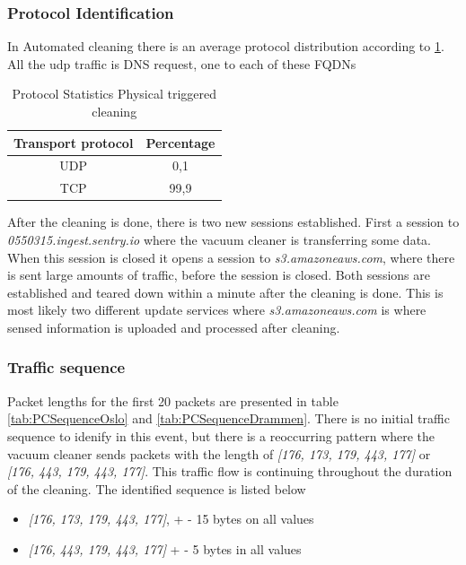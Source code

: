 \subsubsection{Protocol Identification}
In Automated cleaning there is an average protocol distribution according to \ref{tab:pcanalysisdist}. All the udp traffic is DNS request, one to each of these FQDNs

\begin{table}[H]
\centering
\caption{Protocol Statistics Physical triggered cleaning}
\label{tab:pcanalysisdist}
\begin{tabular}{|c|c|}
\hline
\textbf{Transport protocol} & \textbf{Percentage} \\ \hline
UDP                         & 0,1                 \\ \hline
TCP                         & 99,9                \\ \hline
\end{tabular}
\end{table}

After the cleaning is done, there is two new sessions established. First a session to \textit{0550315.ingest.sentry.io} where the vacuum cleaner is transferring some data. When this session is closed it opens a session to \textit{s3.amazoneaws.com}, where there is sent large amounts of traffic, before the session is closed. Both sessions are established and teared down within a minute after the cleaning is done. This is most likely two different update services where \textit{s3.amazoneaws.com} is where sensed information is uploaded and processed after cleaning.

\subsubsection{Traffic sequence}
 Packet lengths for the first 20 packets are presented in table \ref{tab:PCSequenceOslo} and \ref{tab:PCSequenceDrammen}. There is no initial traffic sequence to idenify in this event, but there is a reoccurring pattern where the vacuum cleaner sends packets with the length of \textit{[176, 173, 179, 443, 177]} or \textit{[176, 443, 179, 443, 177]}. This traffic flow is continuing throughout the duration of the cleaning. The identified sequence is listed below
\begin{itemize}
    \item \textit{[176, 173, 179, 443, 177]}, + - 15 bytes on all values 
    \item \textit{[176, 443, 179, 443, 177]} + - 5 bytes in all values
\end{itemize}

